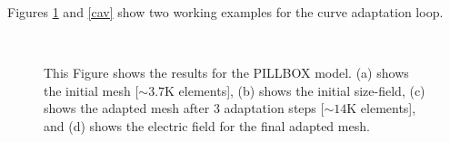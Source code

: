 \documentclass[review,authoryear,12pt]{elsarticle_summary_report}
\begin{document}
Figures \ref{pill} and \ref{cav} show two working examples for the curve adaptation loop. 
\begin{landscape}
\begin{figure}[ph!]
\centering
{}
\hspace*{50pt}
\\
\hspace*{50pt}
\caption{\label{pill} This Figure shows the results for the PILLBOX model. (a) shows the initial mesh [$\sim3.7\text{K}$ elements], (b) shows the initial size-field, (c) shows the adapted mesh after 3 adaptation steps [$\sim14\text{K}$ elements], and (d) shows the electric field for the final adapted mesh.}
\end{figure}
\end{landscape}
\end{document}
